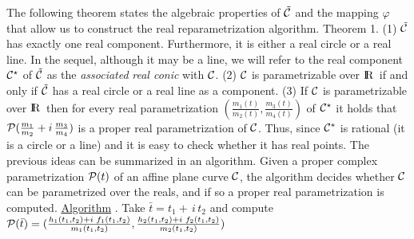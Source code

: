 The following theorem states the algebraic properties of 
$\tilde{{\cal C}}$ and the mapping $\varphi$ that allow us to construct 
the real reparametrization algorithm. 
\vspace{1 mm}
\newline
{\sc Theorem 1.} 
\vspace{1 mm}
\newline
\hspace*{8 mm}
(1) $\tilde{{\cal C}}$ has exactly one real component. 
Furthermore, it is either a real circle or a real line. In the 
\newline
\hspace*{13 mm} sequel, although it may be a line,  we will refer to the 
real component ${\cal C}^{\star}$ of $\tilde{{\cal C}}$ as the 
{\it associated} 
\newline
\hspace*{13 mm} {\it real conic} with ${\cal C}$. 
\vspace{1 mm}
\newline
\hspace*{8 mm}
(2)   ${\cal C}$ is parametrizable over ${\rm I\kern -2.2pt R\hskip 1pt}$ if and only if 
$\tilde{{\cal C}}$ has a real circle or a real line as a component.
\vspace{1 mm}
\newline
\hspace*{8 mm}
(3)  If ${\cal C}$ is parametrizable over ${\rm I\kern -2.2pt R\hskip 1pt}$ then for every 
real parametrization 
$(\frac{m_{1}(t)}{m_{2}(t)},\frac{m_{3}(t)}{m_{4}(t)})$ of 
${\cal C}^{\star}$ it 
\newline
\hspace*{13 mm}
holds that ${\cal P}(\frac{m_1}{m_2}+
i\,\frac{m_3}{m_4})$ is a proper real parametrization of ${\cal C}$.
\vspace{2 mm}
\newline
Thus, since ${\cal C}^{*}$ is rational (it is a circle or a line) and it 
is easy to check whether it has real points. The previous ideas can be 
summarized in an algorithm. Given a proper complex parametrization 
${\cal P}(t)$ of an affine plane curve ${\cal C}$, the algorithm  
decides whether ${\cal C}$ can be parametrized over the reals, and if so a 
proper real parametrization is computed.
\newline
\underline{Algorithm} 
.  Take $\bar{t}=t_1+\,i\,t_2$ and compute
${\cal P}(\bar{t})=(\frac{h_{1}(t_1,t_2)+i\,\, 
f_{1}(t_1,t_2)}{m_{1}(t_1,t_2)}, \frac{h_{2}(t_1,t_2)+i\,\, 
f_{2}(t_1,t_2)}{m_{2}(t_1,t_2)})$ 
\newline
